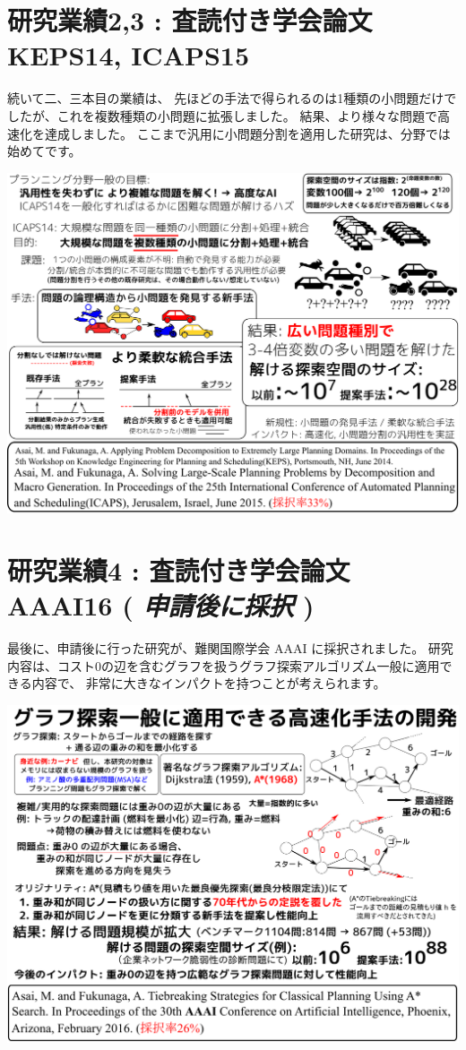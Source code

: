 \section{研究業績2,3 : 査読付き学会論文 KEPS14, ICAPS15}
\label{sec-4}

\begin{resume}
続いて二、三本目の業績は、
先ほどの手法で得られるのは1種類の小問題だけでしたが、これを複数種類の小問題に拡張しました。
結果、より様々な問題で高速化を達成しました。
ここまで汎用に小問題分割を適用した研究は、分野では始めてです。
\end{resume}

\includegraphics{img/assemble-keps14-icaps15.png}

\section{研究業績4 : 査読付き学会論文 AAAI16 ( \textbf{\emph{申請後に採択}} )}
\label{sec-5}

\begin{resume}
最後に、申請後に行った研究が、難関国際学会 AAAI に採択されました。
研究内容は、コスト0の辺を含むグラフを扱うグラフ探索アルゴリズム一般に適用できる内容で、
非常に大きなインパクトを持つことが考えられます。
\end{resume}

\includegraphics{img/aaai16.png}

